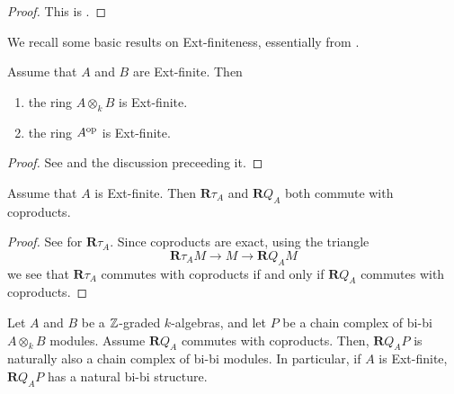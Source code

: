 \begin{proof}
  This is \parencite[Proposition 3.8 (1)]{AZ94}.
\end{proof}

We recall some basic results on Ext-finiteness, essentially from \parencite[Section 4]{VdB}.

\begin{proposition} \label{proposition: tensor and op properties of ext-finite}
  Assume that \(A\) and \(B\) are Ext-finite. Then
  \begin{enumerate}
  \item the ring \(A \otimes_k B\) is Ext-finite. 
  \item the ring \(A^{\operatorname{op}}\) is Ext-finite.
  \end{enumerate}
\end{proposition}

\begin{proof}
  See \parencite[Lemma 4.2]{VdB} and the discussion preceeding it. 
\end{proof}

\begin{proposition} \label{proposition: derived Q commutes with coproducts}
  Assume that \(A\) is Ext-finite. Then \(\mathbf{R}\tau_A\) and \(\mathbf{R}Q_A\) both commute with coproducts. 
\end{proposition}

\begin{proof}
  See \parencite[Lemma 4.3]{VdB} for \(\mathbf{R}\tau_A\). Since coproducts are exact, using the triangle
  \begin{displaymath}
    \mathbf{R}\tau_A M \to M \to \mathbf{R}Q_A M 
  \end{displaymath}
  we see that \(\mathbf{R}\tau_A\) commutes with coproducts if and only if \(\mathbf{R}Q_A\) commutes with coproducts. 
\end{proof}

\begin{corollary} \label{corollary: Q preserves bimodules}
  Let \(A\) and \(B\) be a \(\mathbb{Z}\)-graded \(k\)-algebras, and let \(P\) be a chain complex of bi-bi \(A \otimes_k B\) modules. Assume \(\mathbf{R}Q_A\) commutes with coproducts. Then, \(\mathbf{R}Q_A P\) is naturally also a chain complex of bi-bi modules. In particular, if \(A\) is Ext-finite, \(\mathbf{R}Q_A P\) has a natural bi-bi structure. 
\end{corollary}

